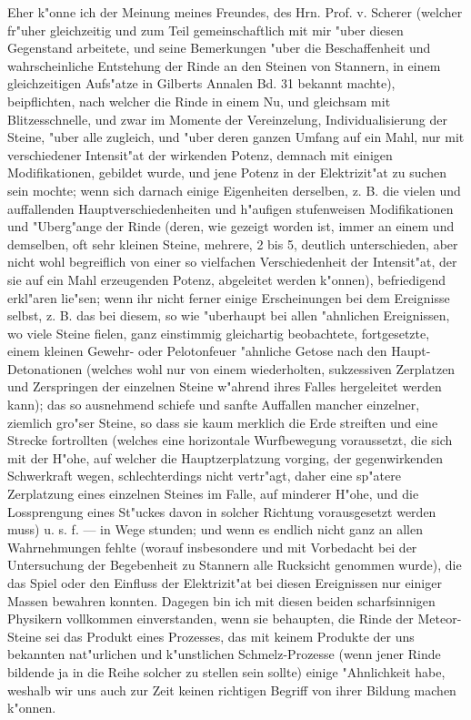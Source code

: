 \documentclass[a4paper, 11pt, oneside, german]{article}
\begin{document}
{{\hspace*{6mm}Eher k"onne ich der Meinung meines Freundes, des Hrn. Prof. v. Scherer (welcher fr"uher gleichzeitig und zum Teil gemeinschaftlich mit mir "uber diesen Gegenstand arbeitete, und seine Bemerkungen "uber die Beschaffenheit und wahrscheinliche Entstehung der Rinde an den Steinen von Stannern, in einem gleichzeitigen Aufs"atze in Gilberts Annalen Bd. 31 bekannt machte), beipflichten, nach welcher die Rinde in einem Nu, und gleichsam mit Blitzesschnelle, und zwar im Momente der Vereinzelung, Individualisierung der Steine, "uber alle zugleich, und "uber deren ganzen Umfang auf ein Mahl, nur mit verschiedener Intensit"at der wirkenden Potenz, demnach mit einigen Modifikationen, gebildet wurde, und jene Potenz in der Elektrizit"at zu suchen sein mochte; wenn sich darnach einige Eigenheiten derselben, z. B. die vielen und auffallenden Hauptverschiedenheiten und h"aufigen stufenweisen Modifikationen und "Uberg"ange der Rinde (deren, wie gezeigt worden ist, immer an einem und demselben, oft sehr kleinen Steine, mehrere, 2 bis 5, deutlich unterschieden, aber nicht wohl begreiflich von einer so vielfachen Verschiedenheit der Intensit"at, der sie auf ein Mahl erzeugenden Potenz, abgeleitet werden k"onnen), befriedigend erkl"aren lie"sen; wenn ihr nicht ferner einige Erscheinungen bei dem Ereignisse selbst, z. B. das bei diesem, so wie "uberhaupt bei allen "ahnlichen Ereignissen, wo viele Steine fielen, ganz einstimmig gleichartig beobachtete, fortgesetzte, einem kleinen Gewehr- oder Pelotonfeuer "ahnliche Getose nach den Haupt-Detonationen (welches wohl nur von einem wiederholten, sukzessiven Zerplatzen und Zerspringen der einzelnen Steine w"ahrend ihres Falles hergeleitet werden kann); das so ausnehmend schiefe und sanfte Auffallen mancher einzelner, ziemlich gro"ser Steine, so dass sie kaum merklich die Erde streiften und eine Strecke fortrollten (welches eine horizontale Wurfbewegung voraussetzt, die sich mit der H"ohe, auf welcher die Hauptzerplatzung vorging, der gegenwirkenden Schwerkraft wegen, schlechterdings nicht vertr"agt, daher eine sp"atere Zerplatzung eines einzelnen Steines im Falle, auf minderer H"ohe, und die Lossprengung eines St"uckes davon in solcher Richtung vorausgesetzt werden muss) u. s. f. --- in Wege stunden; und wenn es endlich nicht ganz an allen Wahrnehmungen fehlte (worauf insbesondere und mit Vorbedacht bei der Untersuchung der Begebenheit zu Stannern alle Rucksicht genommen wurde), die das Spiel oder den Einfluss der Elektrizit"at bei diesen Ereignissen nur einiger Massen bewahren konnten. Dagegen bin ich mit diesen beiden scharfsinnigen Physikern vollkommen einverstanden, wenn sie behaupten, die Rinde der Meteor-Steine sei das Produkt eines Prozesses, das mit keinem Produkte der uns bekannten nat"urlichen und k"unstlichen Schmelz-Prozesse (wenn jener Rinde bildende ja in die Reihe solcher zu stellen sein sollte) einige "Ahnlichkeit habe, weshalb wir uns auch zur Zeit keinen richtigen Begriff von ihrer Bildung machen k"onnen.}}
\clearpage
\end{document}
